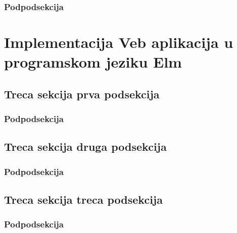 \documentclass{viser-thesis}
\begin{document}
\subsubsection{Podpodsekcija}
\newpage

\section{Implementacija Veb aplikacija u programskom jeziku Elm}
\newpage
\subsection{Treca sekcija prva podsekcija}
\newpage
\subsubsection{Podpodsekcija}
\newpage
\subsection{Treca sekcija druga podsekcija}
\newpage
\subsubsection{Podpodsekcija}
\newpage
\subsection{Treca sekcija treca podsekcija}
\newpage
\subsubsection{Podpodsekcija}
\newpage

\printindex
\newpage

\printbibliography[heading=bibintoc]
\end{document}
